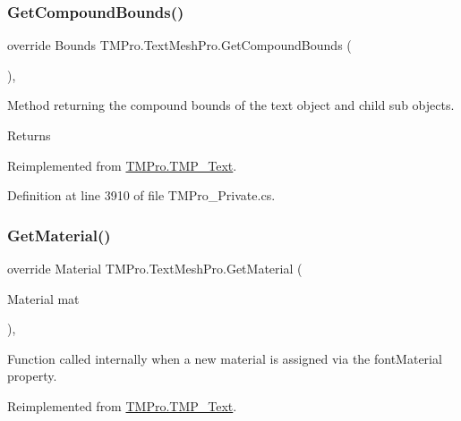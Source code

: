 \subsubsection{\texorpdfstring{GetCompoundBounds()}{GetCompoundBounds()}}
{\footnotesize\ttfamily override Bounds T\+M\+Pro.\+Text\+Mesh\+Pro.\+Get\+Compound\+Bounds (\begin{DoxyParamCaption}{ }\end{DoxyParamCaption})\hspace{0.3cm}{\ttfamily [protected]}, {\ttfamily [virtual]}}



Method returning the compound bounds of the text object and child sub objects. 

\begin{DoxyReturn}{Returns}

\end{DoxyReturn}


Reimplemented from \mbox{\hyperlink{class_t_m_pro_1_1_t_m_p___text_a0628c368c630a855a7001344fca270ba}{T\+M\+Pro.\+T\+M\+P\+\_\+\+Text}}.



Definition at line 3910 of file T\+M\+Pro\+\_\+\+Private.\+cs.

\mbox{\label{class_t_m_pro_1_1_text_mesh_pro_ae6a678bcadc435d05afa59758e5b70f4}} 
\subsubsection{\texorpdfstring{GetMaterial()}{GetMaterial()}}
{\footnotesize\ttfamily override Material T\+M\+Pro.\+Text\+Mesh\+Pro.\+Get\+Material (\begin{DoxyParamCaption}\item[{Material}]{mat }\end{DoxyParamCaption})\hspace{0.3cm}{\ttfamily [protected]}, {\ttfamily [virtual]}}



Function called internally when a new material is assigned via the font\+Material property. 



Reimplemented from \mbox{\hyperlink{class_t_m_pro_1_1_t_m_p___text_a0a573365fce6e2d9e49b0f7d6679834b}{T\+M\+Pro.\+T\+M\+P\+\_\+\+Text}}.



